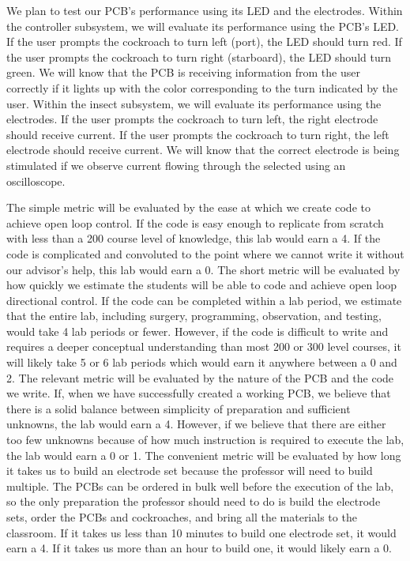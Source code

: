 \documentclass{article}
\begin{document}
\par We plan to test our PCB's performance using its LED and the electrodes. Within the controller subsystem, we will evaluate its performance using the PCB's LED. If the user prompts the cockroach to turn left (port), the LED should turn red. If the user prompts the cockroach to turn right (starboard), the LED should turn green. We will know that the PCB is receiving information from the user correctly if it lights up with the color corresponding to the turn indicated by the user. Within the insect subsystem, we will evaluate its performance using the electrodes. If the user prompts the cockroach to turn left, the right electrode should receive current. If the user prompts the cockroach to turn right, the left electrode should receive current. We will know that the correct electrode is being stimulated if we observe current flowing through the selected using an oscilloscope.

\bigskip

\par The simple metric will be evaluated by the ease at which we create code to achieve open loop control. If the code is easy enough to replicate from scratch with less than a 200 course level of knowledge, this lab would earn a 4. If the code is complicated and convoluted to the point where we cannot write it without our advisor's help, this lab would earn a 0. The short metric will be evaluated by how quickly we estimate the students will be able to code and achieve open loop directional control. If the code can be completed within a lab period, we estimate that the entire lab, including surgery, programming, observation, and testing, would take 4 lab periods or fewer. However, if the code is difficult to write and requires a deeper conceptual understanding than most 200 or 300 level courses, it will likely take 5 or 6 lab periods which would earn it anywhere between a 0 and 2. The relevant metric will be evaluated by the nature of the PCB and the code we write. If, when we have successfully created a working PCB, we believe that there is a solid balance between simplicity of preparation and sufficient unknowns, the lab would earn a 4. However, if we believe that there are either too few unknowns because of how much instruction is required to execute the lab, the lab would earn a 0 or 1. The convenient metric will be evaluated by how long it takes us to build an electrode set because the professor will need to build multiple. The PCBs can be ordered in bulk well before the execution of the lab, so the only preparation the professor should need to do is build the electrode sets, order the PCBs and cockroaches, and bring all the materials to the classroom. If it takes us less than 10 minutes to build one electrode set, it would earn a 4. If it takes us more than an hour to build one, it would likely earn a 0.
\end{document}
